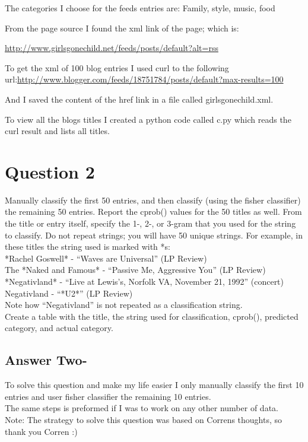 \documentclass[letterpaper,11pt]{article}
\begin{document}
The categories I choose for the feeds entries are:
Family, style, music, food

From the page source I found the xml link of the page; which is:

\url{http://www.girlsgonechild.net/feeds/posts/default?alt=rss}

To get the xml of 100 blog entries I used curl to the following url:\url{http://www.blogger.com/feeds/18751784/posts/default?max-results=100}

And I saved the content of the href link in a file called girlsgonechild.xml.

To view all the blogs titles I created a python code called c.py which reads the curl result and lists all titles. 

\newpage
\section*{Question 2}
Manually classify the first 50 entries, and then classify (using the fisher classifier) the remaining 50 entries. Report the cprob() values for the 50 titles as well. From the title or entry itself, specify the 1-, 2-, or 3-gram that you used for the string to classify. Do not repeat strings; you will have 50 unique strings. For example, in these titles the string used is marked with *s: \\

*Rachel Goswell* - ``Waves are Universal'' (LP Review)\\
The *Naked and Famous* - ``Passive Me, Aggressive You'' (LP Review)\\
*Negativland* - ``Live at Lewis's, Norfolk VA, November 21, 1992'' (concert)\\
Negativland - ``*U2*'' (LP Review)\\


Note how         ``Negativland'' is not repeated as a classification string. \\

Create a table with the title, the string used for classification, cprob(), predicted category, and actual category.


\newpage
\subsection*{Answer Two-}
To solve this question and make my life easier I only 
manually classify the first 10 entries and user fisher classifier the remaining 10 entries.\\ The same steps is preformed if I was to work on  any other number of data.\\
Note: The strategy to solve this question was based on Correns thoughts, so thank you Corren :)
\end{document}
